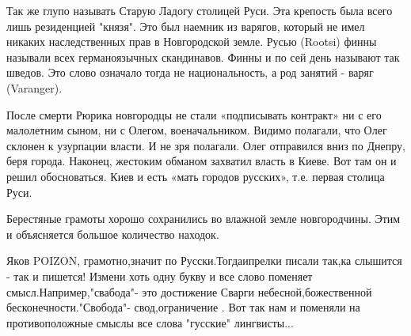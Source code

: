 \begin{itemize}
Так же глупо называть Старую Ладогу столицей Руси. Эта крепость была всего лишь
резиденцией "князя". Это был наемник из варягов, который не имел никаких
наследственных прав в Новгородской земле. Русью (Rootsi) финны называли всех
германоязычных скандинавов. Финны и по сей день называют так шведов. Это слово
означало тогда не национальность, а род занятий - варяг (Varanger).

После смерти Рюрика новгородцы не стали «подписывать контракт» ни с его
малолетним сыном, ни с Олегом, военачальником. Видимо полагали, что Олег
склонен к узурпации власти. И не зря полагали. Олег отправился вниз по Днепру,
беря города. Наконец, жестоким обманом захватил власть в Киеве. Вот там он и
решил обосноваться. Киев и есть «мать городов русских», т.е. первая столица
Руси.

Берестяные грамоты хорошо сохранились во влажной земле новгородчины. Этим и
объясняется большое количество находок.


Яков POIZON, грамотно,значит по Русски.Тогдаипрелки писали так,ка слышится -
так и пишется! Измени хоть одну букву и все слово поменяет
смысл.Например,"свабода"- это достижение Сварги небесной,божественной
бесконечности."Свобода"- свод,ограничение . Вот так нам и поменяли на
противоположные смыслы все слова "гусские" лингвисты...
\end{itemize}
